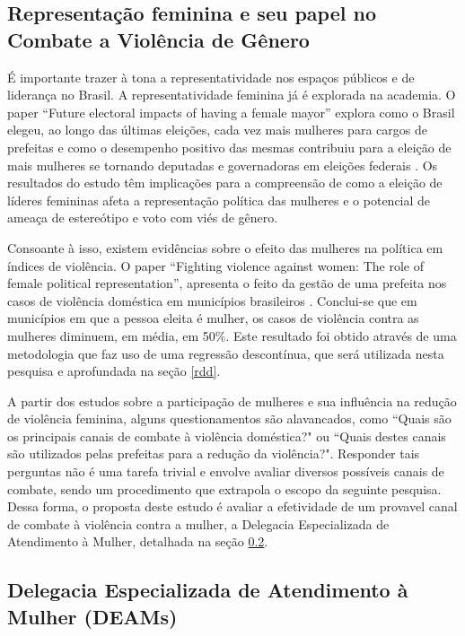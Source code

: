 \subsection{Representação feminina e seu papel no Combate a Violência de Gênero}
\label{representacao_feminina}

É importante trazer à tona a representatividade nos espaços públicos e de liderança no Brasil. A representatividade feminina já é explorada na academia. O paper ``Future electoral impacts of having a female mayor'' explora como o Brasil elegeu, ao longo das últimas eleições, cada vez mais mulheres para cargos de prefeitas e como o desempenho positivo das mesmas contribuiu para a eleição de mais mulheres se tornando deputadas e governadoras em eleições federais \cite{arvate2017future}. Os resultados do estudo têm implicações para a compreensão de como a eleição de líderes femininas afeta a representação política das mulheres e o potencial de ameaça de estereótipo e voto com viés de gênero.

Consoante à isso, existem evidências sobre o efeito das mulheres na política em índices de violência. O paper ``Fighting violence against women: The role of female political representation'', apresenta o feito da gestão de uma prefeita nos casos de violência doméstica em municípios brasileiros \cite{bochenkova2023fighting}. Conclui-se que em municípios em que a pessoa eleita é mulher, os casos de violência contra as mulheres diminuem, em média, em 50\%. Este resultado foi obtido através de uma metodologia que faz uso de uma regressão descontínua, que será utilizada nesta pesquisa e aprofundada na seção \ref{rdd}. 

A partir dos estudos sobre a participação de mulheres e sua influência na redução de violência feminina, alguns questionamentos são alavancados, como ``Quais são os principais canais de combate à violência doméstica?" ou ``Quais destes canais são utilizados pelas prefeitas para a redução da violência?". Responder tais perguntas não é uma tarefa trivial e envolve avaliar diversos possíveis canais de combate, sendo um procedimento que extrapola o escopo da seguinte pesquisa. Dessa forma, o proposta deste estudo é avaliar a efetividade de um provavel canal de combate à violência contra a mulher, a Delegacia Especializada de Atendimento à Mulher, detalhada na seção \ref{DEAMs}. 

\subsection{ Delegacia Especializada de Atendimento à Mulher (DEAMs)}
\label{DEAMs}

